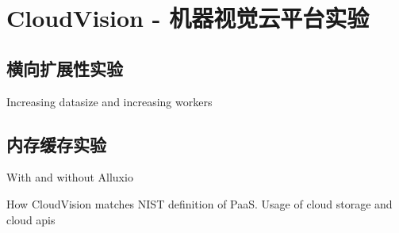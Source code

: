 \chapter{CloudVision - 机器视觉云平台实验}
\label{cha:cloudvision_experiment}


\section{横向扩展性实验}
Increasing datasize and increasing workers


\section{内存缓存实验}
With and without Alluxio

How CloudVision matches NIST definition of PaaS. 
Usage of cloud storage and cloud apis
